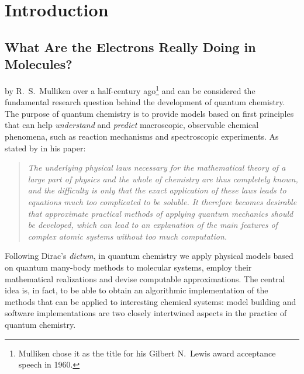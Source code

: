 {}

\chapter*{Introduction}

\renewcommand{\thefigure}{\Alph{figure}}

\section*{What Are the Electrons Really Doing in Molecules?}

 by R.~S.~Mulliken over a half-century
ago\footnote{Mulliken chose it as the title for his Gilbert N.~Lewis
award acceptance speech in 1960.}
and can be considered the fundamental research question behind the
development of quantum chemistry.
The purpose of quantum chemistry is to provide models based on first
principles that can help \emph{understand} and \emph{predict}
macroscopic, observable chemical phenomena, such as reaction mechanisms and
spectroscopic experiments.\autocite{Kovac2011-ew}
As stated by \citeauthor{Dirac1929-gn} in his 
paper:\autocite{Dirac1929-gn, Kutzelnigg2000-fl}
\blockquote{\small\textit{The underlying physical laws necessary for the mathematical
theory of a large part of physics and the whole of chemistry are thus
completely known, and the difficulty is only that the exact application of
these laws leads to equations much too complicated to be soluble. It
therefore becomes desirable that approximate practical methods of
applying quantum mechanics should be developed, which can lead to an
explanation of the main features of complex atomic systems without too
much computation.}}
Following Dirac's \emph{dictum}, in quantum chemistry we apply physical
models based on quantum many-body methods to molecular systems, employ
their mathematical realizations and devise computable approximations.
The central idea is, in fact, to be able to obtain an algorithmic
implementation of the methods that can be applied to interesting
chemical systems: model building and software implementations are two
closely intertwined aspects in the practice of quantum
chemistry.\autocite{Winsberg2010-sy}

